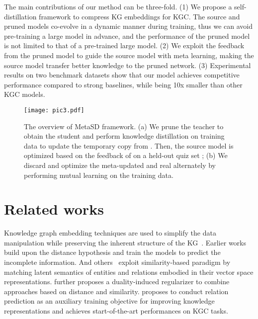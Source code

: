 \documentclass[11pt]{article}
\begin{document}
The main contributions of our method can be three-fold. 
(1) We propose a self-distillation framework to compress KG embeddings for KGC. The source and pruned models co-evolve in a dynamic manner during training, thus we can avoid pre-training a large model in advance, and the performance of the pruned model is not limited to that of a pre-trained large model.
(2) We exploit the feedback from the pruned model to guide the source model with meta learning, making the source model transfer better knowledge to the pruned network. 
(3)  Experimental results on two benchmark datasets show that our model achieves competitive performance compared to strong baselines, while being 10x smaller than other KGC models. 


















\begin{figure*}[]
\centering \texttt{[image: pic3.pdf]}
\caption{The overview of MetaSD framework. (a) We prune the teacher  to obtain the student  and perform knowledge distillation on training data to update the temporary copy  from . Then, the source model  is optimized based on the feedback of  on a held-out quiz set ; (b) We discard  and optimize  the meta-updated  and real  alternately by performing mutual learning on the training data.}
\label{fig:figure1}
\end{figure*}






\iffalse
\section{Related works}
Knowledge graph embedding techniques are used to simplify the data manipulation while preserving the inherent structure of the KG~\citep{wang2017knowledge}. Earlier works~\citep{bordes2013translating,sun2019rotate} build upon the distance hypothesis and train the models to predict the incomplete information. And others~\citep{hit1927,nickel2011three,yang2014embedding,trouillon2016complex} exploit similarity-based paradigm by matching latent semantics of entities and relations embodied in their vector space representations. \citet{zhang2020duality} further  proposes a duality-induced regularizer to combine approaches based on distance and similarity. \citet{chen2021relation} proposes to conduct relation prediction as an auxiliary training objective for improving knowledge representations and achieves start-of-the-art performances on KGC tasks.
\end{document}
